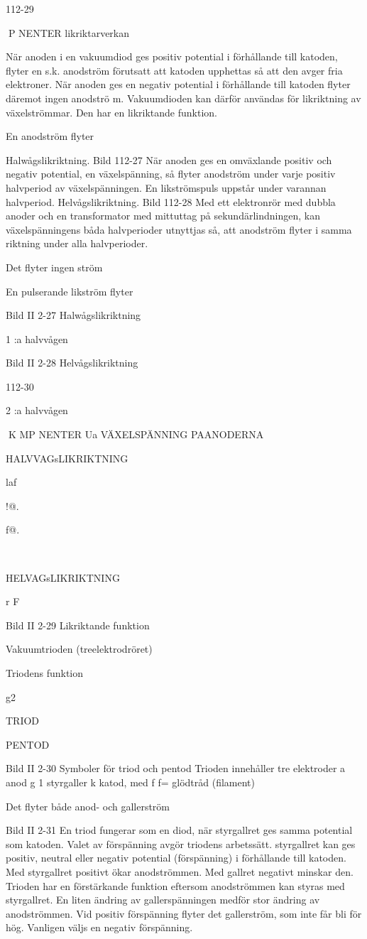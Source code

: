 \documentclass[a4paper,twoside,twocolumn,openright]{book}
\begin{document}
{{{{112-29

P NENTER
likriktarverkan

När anoden i en vakuumdiod ges positiv
potential i förhållande till katoden, flyter en
s.k. anodström förutsatt att katoden upphettas så att den avger fria elektroner.
När anoden ges en negativ potential i
förhållande till katoden flyter däremot ingen
anodströ m.
Vakuumdioden kan därför användas för
likriktning av växelströmmar. Den har en
likriktande funktion.

En anodström flyter

Halwågslikriktning.
Bild 112-27
När anoden ges en omväxlande positiv och
negativ potential, en växelspänning, så flyter
anodström under varje positiv halvperiod av
växelspänningen. En likströmspuls uppstår
under varannan halvperiod.
Helvågslikriktning.
Bild 112-28
Med ett elektronrör med dubbla anoder och
en transformator med mittuttag på sekundärlindningen, kan växelspänningens båda
halvperioder utnyttjas så, att anodström flyter i samma riktning under alla halvperioder.

Det flyter ingen ström

En pulserande likström flyter

Bild II 2-27 Halwågslikriktning

1 :a halvvågen

Bild II 2-28 Helvågslikriktning

112-30

2 :a halvvågen

K MP NENTER
Ua
VÄXELSPÄNNING
PAANODERNA

HALVVAGsLIKRIKTNING

laf

!@.

f@.

~

HELVAGsLIKRIKTNING

r
F

Bild II 2-29 Likriktande funktion

Vakuumtrioden (treelektrodröret)

Triodens funktion

g2

TRIOD

PENTOD

Bild II 2-30 Symboler för triod och pentod
Trioden innehåller tre elektroder
a anod
g 1 styrgaller
k katod, med f f= glödtråd (filament)

Det flyter både anod- och gallerström

Bild II 2-31
En triod fungerar som en diod, när styrgallret
ges samma potential som katoden. Valet av
förspänning avgör triodens arbetssätt. styrgallret kan ges positiv, neutral eller negativ
potential (förspänning) i förhållande till katoden. Med styrgallret positivt ökar anodströmmen. Med gallret negativt minskar den.
Trioden har en förstärkande funktion eftersom anodströmmen kan styras med styrgallret. En liten ändring av gallerspänningen
medför stor ändring av anodströmmen. Vid
positiv förspänning flyter det gallerström,
som inte får bli för hög. Vanligen väljs en
negativ förspänning.

}}}}
\end{document}
